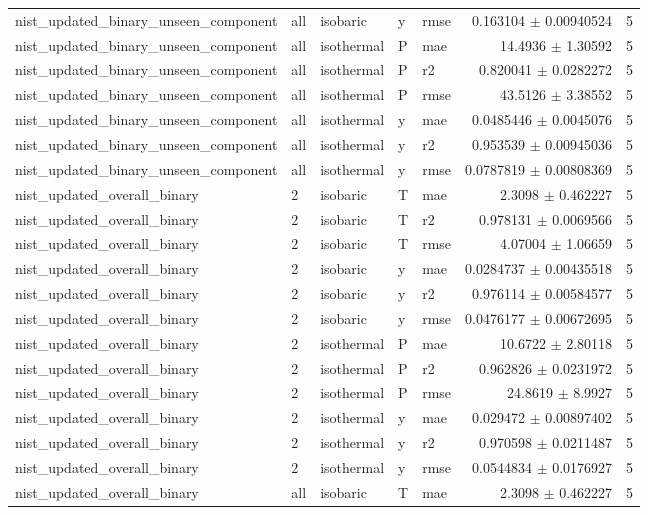 \begin{tabular}{lllllrr}
nist\_updated\_binary\_unseen\_component & all & isobaric & y & rmse & 0.163104 $\pm$ 0.00940524 & 5 \\
nist\_updated\_binary\_unseen\_component & all & isothermal & P & mae & 14.4936 $\pm$ 1.30592 & 5 \\
nist\_updated\_binary\_unseen\_component & all & isothermal & P & r2 & 0.820041 $\pm$ 0.0282272 & 5 \\
nist\_updated\_binary\_unseen\_component & all & isothermal & P & rmse & 43.5126 $\pm$ 3.38552 & 5 \\
nist\_updated\_binary\_unseen\_component & all & isothermal & y & mae & 0.0485446 $\pm$ 0.0045076 & 5 \\
nist\_updated\_binary\_unseen\_component & all & isothermal & y & r2 & 0.953539 $\pm$ 0.00945036 & 5 \\
nist\_updated\_binary\_unseen\_component & all & isothermal & y & rmse & 0.0787819 $\pm$ 0.00808369 & 5 \\
nist\_updated\_overall\_binary & 2 & isobaric & T & mae & 2.3098 $\pm$ 0.462227 & 5 \\
nist\_updated\_overall\_binary & 2 & isobaric & T & r2 & 0.978131 $\pm$ 0.0069566 & 5 \\
nist\_updated\_overall\_binary & 2 & isobaric & T & rmse & 4.07004 $\pm$ 1.06659 & 5 \\
nist\_updated\_overall\_binary & 2 & isobaric & y & mae & 0.0284737 $\pm$ 0.00435518 & 5 \\
nist\_updated\_overall\_binary & 2 & isobaric & y & r2 & 0.976114 $\pm$ 0.00584577 & 5 \\
nist\_updated\_overall\_binary & 2 & isobaric & y & rmse & 0.0476177 $\pm$ 0.00672695 & 5 \\
nist\_updated\_overall\_binary & 2 & isothermal & P & mae & 10.6722 $\pm$ 2.80118 & 5 \\
nist\_updated\_overall\_binary & 2 & isothermal & P & r2 & 0.962826 $\pm$ 0.0231972 & 5 \\
nist\_updated\_overall\_binary & 2 & isothermal & P & rmse & 24.8619 $\pm$ 8.9927 & 5 \\
nist\_updated\_overall\_binary & 2 & isothermal & y & mae & 0.029472 $\pm$ 0.00897402 & 5 \\
nist\_updated\_overall\_binary & 2 & isothermal & y & r2 & 0.970598 $\pm$ 0.0211487 & 5 \\
nist\_updated\_overall\_binary & 2 & isothermal & y & rmse & 0.0544834 $\pm$ 0.0176927 & 5 \\
nist\_updated\_overall\_binary & all & isobaric & T & mae & 2.3098 $\pm$ 0.462227 & 5 \\

\end{tabular}
